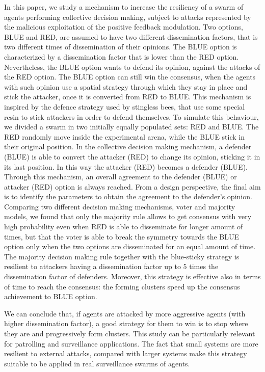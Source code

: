 \documentclass[sigconf]{acmart}
\begin{document}
In this paper, we study a mechanism to increase the resiliency of a swarm of agents performing collective decision making, subject to attacks represented by the malicious exploitation of the positive feedback modulation. Two options, BLUE and RED, are assumed to have two different dissemination factors, that is two different times of dissemination of their opinions. The BLUE option is characterized by a dissemination factor that is lower than the RED option. Nevertheless, the BLUE option wants to defend its opinion, against the attacks of the RED option. The BLUE option can still win the consensus, when the agents with such opinion use a  spatial strategy through which they stay in place and stick the attacker, once it is converted from RED to BLUE. %
This mechanism is  inspired by the defence strategy used by stingless bees, that use some special resin to stick attackers in order to defend themselves. %
To simulate this behaviour, we divided a swarm in two initially equally populated sets: RED and BLUE. The RED randomly move inside the experimental arena, while the BLUE stick in their original position. In the collective decision making mechanism, a defender (BLUE) is able to convert the attacker (RED) to change its opinion, sticking it in its last position. In this way the attacker (RED) becomes a defender (BLUE). Through this mechanism, an overall agreement to the defender (BLUE) or attacker (RED) option is always reached. From a design perspective, the final aim is to identify the parameters to obtain  the agreement to the defender's opinion. Comparing two different decision making mechanisms, voter and majority models, we found that  only the majority rule allows to get consensus with very high probability even when RED is able to disseminate for longer amount of times, but that the voter is able to break the symmetry towards the BLUE option only when the two options are disseminated for an equal amount of time.  %
The majority decision making rule together with the blue-sticky strategy is resilient to attackers having a dissemination factor up to $5$ times the dissemination factor of defenders. Moreover, this strategy is effective also in terms of time to reach the consensus: the forming clusters speed up the consensus achievement to BLUE option. 

We can conclude that, if agents are attacked by more aggressive agents (with higher dissemination factor), a good strategy for them to win is to stop where they are and progressively form clusters. This study can be particularly relevant for patrolling and surveillance applications. The fact that small systems are more resilient to external attacks, compared with larger systems make this strategy suitable to be applied in real surveillance swarms of agents.
\end{document}

